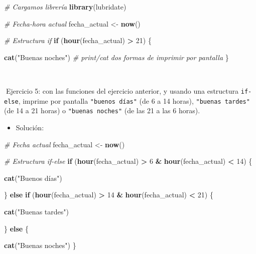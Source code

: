 \documentclass[11pt,]{book}
\newenvironment{Shaded}{\begin{snugshade}}{\end{snugshade}}
\newcommand{\CommentTok}[1]{\textcolor[rgb]{0.37,0.37,0.37}{\textit{#1}}}
\newcommand{\ControlFlowTok}[1]{\textcolor[rgb]{0.27,0.27,0.27}{\textbf{#1}}}
\newcommand{\DecValTok}[1]{\textcolor[rgb]{0.06,0.06,0.06}{#1}}
\newcommand{\KeywordTok}[1]{\textcolor[rgb]{0.27,0.27,0.27}{\textbf{#1}}}
\newcommand{\NormalTok}[1]{#1}
\newcommand{\OperatorTok}[1]{\textcolor[rgb]{0.43,0.43,0.43}{\textbf{#1}}}
\newcommand{\StringTok}[1]{\textcolor[rgb]{0.5,0.5,0.5}{#1}}
\providecommand{\tightlist}{%
  \setlength{\itemsep}{0pt}\setlength{\parskip}{0pt}}
\begin{document}
\begin{Shaded}
\begin{Highlighting}[]
\CommentTok{# Cargamos librería}
\KeywordTok{library}\NormalTok{(lubridate)}

\CommentTok{# Fecha-hora actual}
\NormalTok{fecha_actual <-}\StringTok{ }\KeywordTok{now}\NormalTok{()}

\CommentTok{# Estructura if}
\ControlFlowTok{if}\NormalTok{ (}\KeywordTok{hour}\NormalTok{(fecha_actual) }\OperatorTok{>}\StringTok{ }\DecValTok{21}\NormalTok{) \{}
  
  \KeywordTok{cat}\NormalTok{(}\StringTok{"Buenas noches"}\NormalTok{) }\CommentTok{# print/cat dos formas de imprimir por pantalla}
\NormalTok{\}}
\end{Highlighting}
\end{Shaded}

~

📝Ejercicio 5: con las funciones del ejercicio anterior, y usando una estructura \texttt{if-else}, imprime por pantalla \texttt{"buenos\ días"} (de 6 a 14 horas), \texttt{"buenas\ tardes"} (de 14 a 21 horas) o \texttt{"buenas\ noches"} (de las 21 a las 6 horas).

\begin{itemize}
\tightlist
\item
  Solución:
\end{itemize}

\begin{Shaded}
\begin{Highlighting}[]
\CommentTok{# Fecha actual}
\NormalTok{fecha_actual <-}\StringTok{ }\KeywordTok{now}\NormalTok{()}

\CommentTok{# Estructura if-else}
\ControlFlowTok{if}\NormalTok{ (}\KeywordTok{hour}\NormalTok{(fecha_actual) }\OperatorTok{>}\StringTok{ }\DecValTok{6} \OperatorTok{&}\StringTok{ }\KeywordTok{hour}\NormalTok{(fecha_actual) }\OperatorTok{<}\StringTok{ }\DecValTok{14}\NormalTok{) \{}
  
  \KeywordTok{cat}\NormalTok{(}\StringTok{"Buenos días"}\NormalTok{)}
  
\NormalTok{\} }\ControlFlowTok{else} \ControlFlowTok{if}\NormalTok{ (}\KeywordTok{hour}\NormalTok{(fecha_actual) }\OperatorTok{>}\StringTok{ }\DecValTok{14} \OperatorTok{&}\StringTok{ }\KeywordTok{hour}\NormalTok{(fecha_actual) }\OperatorTok{<}\StringTok{ }\DecValTok{21}\NormalTok{) \{}
  
  \KeywordTok{cat}\NormalTok{(}\StringTok{"Buenas tardes"}\NormalTok{)}
  
\NormalTok{\} }\ControlFlowTok{else}\NormalTok{ \{}
  
  \KeywordTok{cat}\NormalTok{(}\StringTok{"Buenas noches"}\NormalTok{)}
\NormalTok{\}}
\end{Highlighting}
\end{Shaded}
\end{document}
